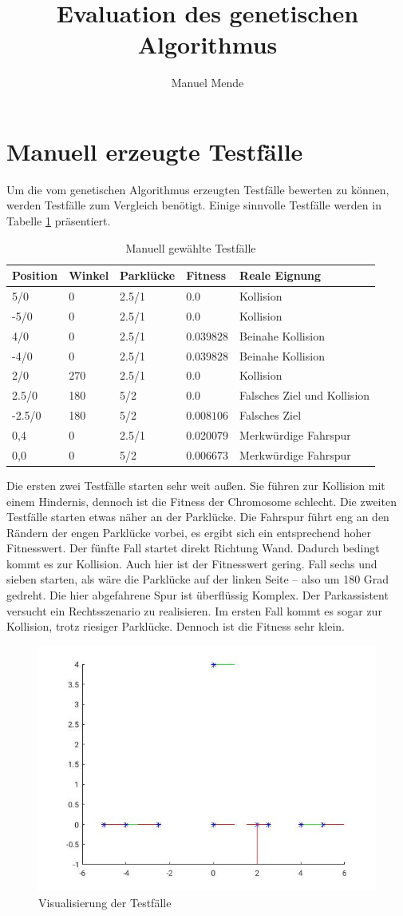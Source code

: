 \documentclass[12pt,a4paper]{article}
\author{Manuel Mende}
\title{Evaluation des genetischen Algorithmus}
\begin{document}
\maketitle
\section{Manuell erzeugte Testfälle}
Um die vom genetischen Algorithmus erzeugten Testfälle bewerten zu können, werden Testfälle zum Vergleich benötigt. Einige sinnvolle Testfälle werden in Tabelle \ref{tab:testfaelle} präsentiert.
\begin{table}\centering
\begin{tabular}{l|l|l|l|l}
Position & Winkel & Parklücke & Fitness & Reale Eignung \\\hline
5/0 & 0 & 2.5/1 & $0.0$ & Kollision \\
-5/0 & 0 & 2.5/1 & $0.0$ & Kollision \\
4/0 & 0 & 2.5/1 & $0.039828$ & Beinahe Kollision \\
-4/0 & 0 & 2.5/1 & $0.039828$ & Beinahe Kollision \\
2/0 & 270 & 2.5/1 & $0.0$ & Kollision \\
2.5/0 & 180 & 5/2 & $0.0$ & Falsches Ziel und Kollision \\
-2.5/0 & 180 & 5/2 & $0.008106$ & Falsches Ziel \\
0,4 &  0 & 2.5/1 & 0.020079 & Merkwürdige Fahrspur \\
0,0 &  0 & 5/2 & 0.006673 & Merkwürdige Fahrspur \\
\end{tabular}
\caption{Manuell gewählte Testfälle}
\label{tab:testfaelle}
\end{table}
Die ersten zwei Testfälle starten sehr weit außen. Sie führen zur Kollision mit einem Hindernis, dennoch ist die Fitness der Chromosome schlecht. Die zweiten Testfälle starten etwas näher an der Parklücke. Die Fahrspur führt eng an den Rändern der engen Parklücke vorbei, es ergibt sich ein entsprechend hoher Fitnesswert. Der fünfte Fall startet direkt Richtung Wand. Dadurch bedingt kommt es zur Kollision. Auch hier ist der Fitnesswert gering. Fall sechs und sieben starten, als wäre die Parklücke auf der linken Seite -- also um 180 Grad gedreht. Die hier abgefahrene Spur ist überflüssig Komplex. Der Parkassistent versucht ein Rechtsszenario zu realisieren. Im ersten Fall kommt es sogar zur Kollision, trotz riesiger Parklücke. Dennoch ist die Fitness sehr klein.
\begin{figure}\centering
\includegraphics[width=.6\textwidth]{myTestcases.jpg}
\caption{Visualisierung der Testfälle}
\label{fig:testcases}
\end{figure}
\end{document}
